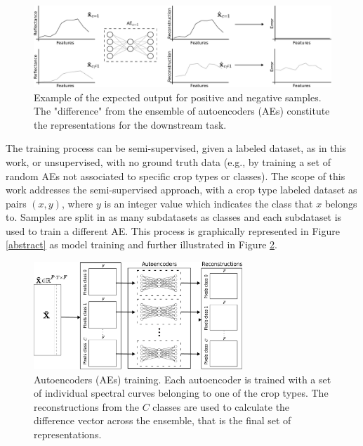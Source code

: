 \documentclass[journal,article,submit,pdftex,moreauthors]{Definitions/mdpi}
\begin{document}
\begin{figure}[H]
	\includegraphics[width=\textwidth]{figures/AE_example_corrected.pdf}
	\caption{Example of the expected output for positive and negative samples. The "difference" from the ensemble of autoencoders (AEs) constitute the representations for the downstream task.}
	\label{errors}
\end{figure}
The training process can be semi-supervised, given a labeled dataset, as in this work, or unsupervised, with no ground truth data (e.g., by training a set of random \ac{AEs} not associated to specific crop types or classes). 
The scope of this work addresses the semi-supervised approach, with a crop type labeled dataset as pairs $(x,y)$, where $y$ is an integer value which indicates the class that $x$ belongs to. Samples are split in as many subdatasets as classes and each subdataset is used to train a different AE.
This process is graphically represented in Figure \ref{abstract} as model training and further illustrated in Figure \ref{aes_train}.

\begin{figure}[H]
	\centering
	\includegraphics[width=0.7\textwidth]{figures/training.pdf}
	\caption{Autoencoders (AEs) training. Each autoencoder is trained with a set of individual spectral curves belonging to one of the crop types. The reconstructions from the $C$ classes are used to calculate the difference vector across the ensemble, that is the final set of representations.}    
	\label{aes_train}      
\end{figure}
\end{document}
